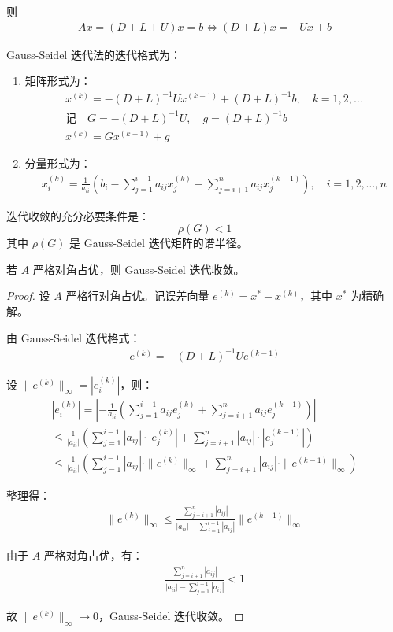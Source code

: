则\begin{gather*}
    Ax = (D + L + U)x = b \Leftrightarrow (D + L)x = -Ux + b 
\end{gather*}

Gauss-Seidel 迭代法的迭代格式为：
\begin{enumerate}
    \item 矩阵形式为：
\begin{gather*}
x^{(k)} = -(D + L)^{-1}Ux^{(k-1)} + (D + L)^{-1}b, \quad k = 1, 2, \dots\\
\text{记}\quad G = -(D + L)^{-1}U,\quad g = (D + L)^{-1}b\\
x^{(k)} = Gx^{(k-1)} + g
\end{gather*}

\item 分量形式为：
\begin{gather*}
x_i^{(k)} = \frac{1}{a_{ii}} \left( b_i - \sum_{j=1}^{i-1} a_{ij}x_j^{(k)} - \sum_{j=i+1}^{n} a_{ij}x_j^{(k-1)} \right), \quad i = 1, 2, \dots, n
\end{gather*}
\end{enumerate}

迭代收敛的充分必要条件是：
\[
\rho(G) < 1
\]
其中 $\rho(G)$ 是 Gauss-Seidel 迭代矩阵的谱半径。

\begin{theorem}
    若 $A$ 严格对角占优，则 Gauss-Seidel 迭代收敛。
\begin{proof}
设 $A$ 严格行对角占优。记误差向量 $e^{(k)} = x^* - x^{(k)}$，其中 $x^*$ 为精确解。

由 Gauss-Seidel 迭代格式：
\begin{gather*}
e^{(k)} = -(D + L)^{-1}U e^{(k-1)}
\end{gather*}

设 $\|e^{(k)}\|_\infty = |e_i^{(k)}|$，则：
\begin{gather*}
|e_i^{(k)}| = \left| -\frac{1}{a_{ii}} \left( \sum_{j=1}^{i-1} a_{ij}e_j^{(k)} + \sum_{j=i+1}^{n} a_{ij}e_j^{(k-1)} \right) \right| \\
\leq \frac{1}{|a_{ii}|} \left( \sum_{j=1}^{i-1} |a_{ij}|\cdot|e_j^{(k)}| + \sum_{j=i+1}^{n} |a_{ij}|\cdot|e_j^{(k-1)}| \right) \\
\leq \frac{1}{|a_{ii}|} \left( \sum_{j=1}^{i-1} |a_{ij}|\cdot\|e^{(k)}\|_\infty + \sum_{j=i+1}^{n} |a_{ij}|\cdot\|e^{(k-1)}\|_\infty \right)
\end{gather*}

整理得：
\begin{gather*}
\|e^{(k)}\|_\infty \leq \frac{\sum_{j=i+1}^{n} |a_{ij}|}{|a_{ii}| - \sum_{j=1}^{i-1} |a_{ij}|} \|e^{(k-1)}\|_\infty
\end{gather*}

由于 $A$ 严格对角占优，有：
\begin{gather*}
\frac{\sum_{j=i+1}^{n} |a_{ij}|}{|a_{ii}| - \sum_{j=1}^{i-1} |a_{ij}|} < 1
\end{gather*}

故 $\|e^{(k)}\|_\infty \to 0$，Gauss-Seidel 迭代收敛。
\end{proof}
\end{theorem}

